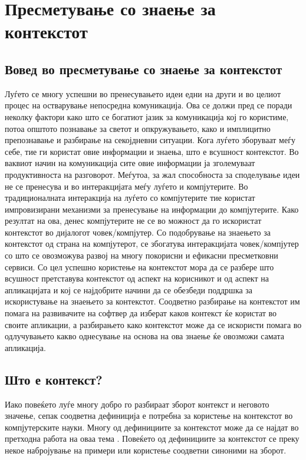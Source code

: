 \chapter{Пресметување со знаење за контекстот}
 
\section{Вовед во пресметување со знаење за контекстот} 

Луѓето се многу успешни во пренесувањето идеи едни на други и во целиот процес
на остварување непосредна комуникација. Ова се должи пред се поради неколку
фактори како што се богатиот јазик за комуникација кој го користиме, потоа
општото познавање за светот и опкружувањето, како и имплицитно препознавање и
разбирање на секојдневни ситуации. Кога луѓето зборуваат меѓу
себе, тие ги користат овие информации и знаења, што е всушност контекстот. Во
ваквиот начин на комуникација сите овие информации ја зголемуваат продуктивноста
на разговорот. Меѓутоа, за жал способноста за споделување идеи не се пренесува и
во интеракцијата меѓу луѓето и компјутерите. Во традиционалната интеракција на
луѓето со компјутерите тие користат импровизирани механизми за пренесување на
информации до компјутерите. Како резултат на ова, денес компјутерите не се во
можност да го искористат контекстот во дијалогот човек/компјутер. Со подобрување
на знаењето за контекстот од страна на компјутерот, се збогатува интеракцијата
човек/компјутер со што се овозможува развој на многу покорисни и ефикасни
пресметковни сервиси. Со цел успешно користење на контекстот мора да се разбере
што всушност претставува контекстот од аспект на корисникот и од аспект на
апликацијата и кој се најдобрите начини да се обезбеди поддршка за искористување
на знаењето за контекстот. Соодветно разбирање на контекстот им помага на
развивачите на софтвер да изберат каков контекст ќе користат во своите
апликации, а разбирањето како контекстот може да се искористи помага во
одлучувањето какво однесување на основа на ова знаење ќе овозможи самата
апликација. 

\section{Што е контекст?}

Иако повеќето луѓе многу добро го разбираат зборот контекст и неговото значење,
сепак соодветна дефиниција е потребна за користење на контекстот во
компјутерските науки. Многу од дефинициите за контекстот може да се најдат во
претходна работа на оваа тема \cite{dey2001understanding,schilit1995system}.
Повеќето од дефинициите за контекстот се преку некое набројување на примери или
користење соодветни синоними на зборот.

